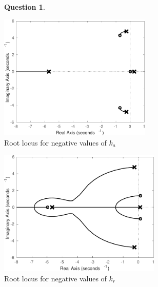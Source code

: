 \documentclass{article}
\theoremstyle{definition}
\newtheorem{question}{Question}
\begin{document}
\begin{question}
\begin{minipage}{0.5\textwidth}
    \begin{center}
        \includegraphics[height=6cm]{figures/roll_root_locus.pdf}\\
        Root locus for negative values of $k_a$
    \end{center}
\end{minipage}
\begin{minipage}{0.5\textwidth}
    \begin{center}
        \includegraphics[height=6cm]{figures/yaw_root_locus.pdf}\\
        Root locus for negative values of $k_r$
    \end{center}
\end{minipage}


\end{question}
\end{document}
